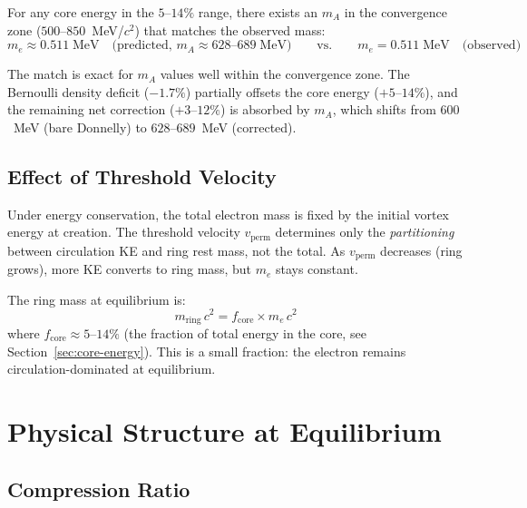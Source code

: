 \documentclass[12pt,letterpaper]{article}
\begin{document}
For any core energy in the $5$--$14\%$ range, there exists an $m_A$ in the
convergence zone ($500$--$850$~MeV/$c^2$) that matches the observed mass:
%
\begin{equation}
  \boxed{m_e \approx 0.511\;\text{MeV} \quad\text{(predicted, }m_A \approx
  628\text{--}689\;\text{MeV)}
  \qquad\text{vs.}\qquad
  m_e = 0.511\;\text{MeV} \quad\text{(observed)}}
  \label{eq:result}
\end{equation}

The match is exact for $m_A$ values well within the convergence zone.  The
Bernoulli density deficit ($-1.7\%$) partially offsets the core energy
($+5$--$14\%$), and the remaining net correction ($+3$--$12\%$) is absorbed
by $m_A$, which shifts from $600$~MeV (bare Donnelly) to $628$--$689$~MeV
(corrected).

\subsection{Effect of Threshold Velocity}

Under energy conservation, the total electron mass is fixed by the initial
vortex energy at creation.  The threshold velocity $v_{\mathrm{perm}}$
determines only the \emph{partitioning} between circulation KE and ring
rest mass, not the total.  As $v_{\mathrm{perm}}$ decreases (ring grows),
more KE converts to ring mass, but $m_e$ stays constant.

The ring mass at equilibrium is:
%
\begin{equation}
  m_{\mathrm{ring}}\,c^2 = f_{\mathrm{core}} \times m_e\,c^2
  \label{eq:mring}
\end{equation}
%
where $f_{\mathrm{core}} \approx 5$--$14\%$ (the fraction of total energy
in the core, see Section~\ref{sec:core-energy}).  This is a small fraction:
the electron remains circulation-dominated at equilibrium.


\section{Physical Structure at Equilibrium}
\label{sec:structure}

\subsection{Compression Ratio}
\label{sec:compression}
\end{document}
